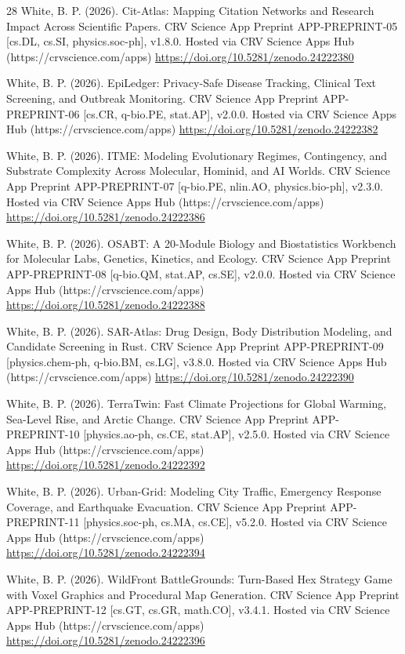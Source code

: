 \documentclass[10pt,letterpaper]{article}
\begin{document}
\begin{thebibliography}{28}
 White, B. P. (2026). Cit-Atlas: Mapping Citation Networks and Research Impact Across Scientific Papers. CRV Science App Preprint APP-PREPRINT-05 [cs.DL, cs.SI, physics.soc-ph], v1.8.0. Hosted via CRV Science Apps Hub (https://crvscience.com/apps) \url{https://doi.org/10.5281/zenodo.24222380}

 White, B. P. (2026). EpiLedger: Privacy-Safe Disease Tracking, Clinical Text Screening, and Outbreak Monitoring. CRV Science App Preprint APP-PREPRINT-06 [cs.CR, q-bio.PE, stat.AP], v2.0.0. Hosted via CRV Science Apps Hub (https://crvscience.com/apps) \url{https://doi.org/10.5281/zenodo.24222382}

 White, B. P. (2026). ITME: Modeling Evolutionary Regimes, Contingency, and Substrate Complexity Across Molecular, Hominid, and AI Worlds. CRV Science App Preprint APP-PREPRINT-07 [q-bio.PE, nlin.AO, physics.bio-ph], v2.3.0. Hosted via CRV Science Apps Hub (https://crvscience.com/apps) \url{https://doi.org/10.5281/zenodo.24222386}

 White, B. P. (2026). OSABT: A 20-Module Biology and Biostatistics Workbench for Molecular Labs, Genetics, Kinetics, and Ecology. CRV Science App Preprint APP-PREPRINT-08 [q-bio.QM, stat.AP, cs.SE], v2.0.0. Hosted via CRV Science Apps Hub (https://crvscience.com/apps) \url{https://doi.org/10.5281/zenodo.24222388}

 White, B. P. (2026). SAR-Atlas: Drug Design, Body Distribution Modeling, and Candidate Screening in Rust. CRV Science App Preprint APP-PREPRINT-09 [physics.chem-ph, q-bio.BM, cs.LG], v3.8.0. Hosted via CRV Science Apps Hub (https://crvscience.com/apps) \url{https://doi.org/10.5281/zenodo.24222390}

 White, B. P. (2026). TerraTwin: Fast Climate Projections for Global Warming, Sea-Level Rise, and Arctic Change. CRV Science App Preprint APP-PREPRINT-10 [physics.ao-ph, cs.CE, stat.AP], v2.5.0. Hosted via CRV Science Apps Hub (https://crvscience.com/apps) \url{https://doi.org/10.5281/zenodo.24222392}

 White, B. P. (2026). Urban-Grid: Modeling City Traffic, Emergency Response Coverage, and Earthquake Evacuation. CRV Science App Preprint APP-PREPRINT-11 [physics.soc-ph, cs.MA, cs.CE], v5.2.0. Hosted via CRV Science Apps Hub (https://crvscience.com/apps) \url{https://doi.org/10.5281/zenodo.24222394}

 White, B. P. (2026). WildFront BattleGrounds: Turn-Based Hex Strategy Game with Voxel Graphics and Procedural Map Generation. CRV Science App Preprint APP-PREPRINT-12 [cs.GT, cs.GR, math.CO], v3.4.1. Hosted via CRV Science Apps Hub (https://crvscience.com/apps) \url{https://doi.org/10.5281/zenodo.24222396}


\end{thebibliography}
\end{document}
